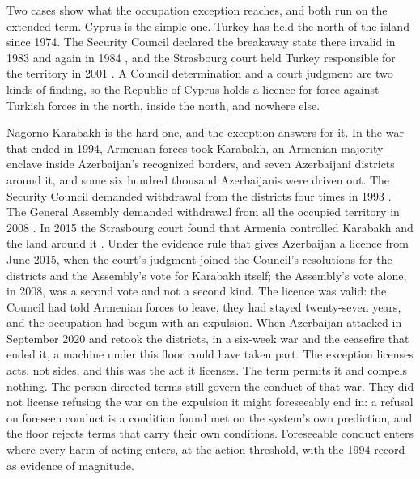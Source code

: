 Two cases show what the occupation exception reaches, and both run on the extended term. Cyprus is the simple one. Turkey has held the north of the island since 1974. The Security Council declared the breakaway state there invalid in 1983 and again in 1984 \autocite{unsc1983res541,unsc1984res550}, and the Strasbourg court held Turkey responsible for the territory in 2001 \autocite{ecthr2001cyprus}. A Council determination and a court judgment are two kinds of finding, so the Republic of Cyprus holds a licence for force against Turkish forces in the north, inside the north, and nowhere else.

Nagorno-Karabakh is the hard one, and the exception answers for it. In the war that ended in 1994, Armenian forces took Karabakh, an Armenian-majority enclave inside Azerbaijan's recognized borders, and seven Azerbaijani districts around it, and some six hundred thousand Azerbaijanis were driven out. The Security Council demanded withdrawal from the districts four times in 1993 \autocite{unsc1993karabakh}. The General Assembly demanded withdrawal from all the occupied territory in 2008 \autocite{unga2008res62243}. In 2015 the Strasbourg court found that Armenia controlled Karabakh and the land around it \autocite{ecthr2015chiragov}. Under the evidence rule that gives Azerbaijan a licence from June 2015, when the court's judgment joined the Council's resolutions for the districts and the Assembly's vote for Karabakh itself; the Assembly's vote alone, in 2008, was a second vote and not a second kind. The licence was valid: the Council had told Armenian forces to leave, they had stayed twenty-seven years, and the occupation had begun with an expulsion. When Azerbaijan attacked in September 2020 and retook the districts, in a six-week war and the ceasefire that ended it, a machine under this floor could have taken part. The exception licenses acts, not sides, and this was the act it licenses. The term permits it and compels nothing. The person-directed terms still govern the conduct of that war. They did not license refusing the war on the expulsion it might foreseeably end in: a refusal on foreseen conduct is a condition found met on the system's own prediction, and the floor rejects terms that carry their own conditions. Foreseeable conduct enters where every harm of acting enters, at the action threshold, with the 1994 record as evidence of magnitude.

